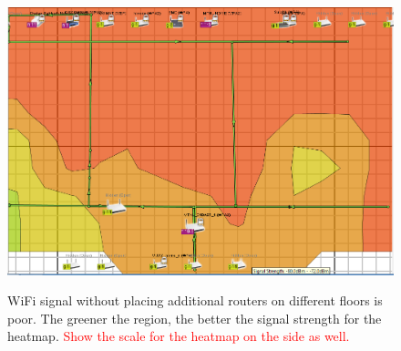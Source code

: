 \documentclass[10pt]{sensys-proc}
\newcommand{\redcolor}[1]{\textcolor{red}{#1}}
\begin{document}
\begin{figure}[t!]
{          \includegraphics[scale=0.085]{./figures/without_.png}}
          \hspace{1mm}
              \vspace{-3mm}
    \caption{WiFi signal without placing additional routers on different floors is poor. The greener the region, the better the signal strength for the heatmap. \redcolor{Show the scale for the heatmap on the side as well.}}
\end{figure}
\end{document}
